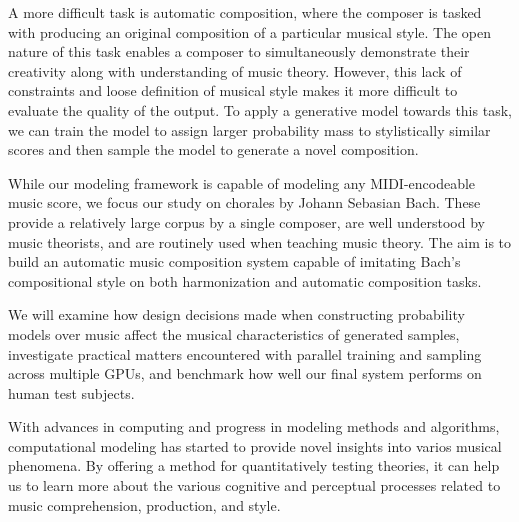 A more difficult task is automatic composition, where the composer is tasked
with producing an original composition of a particular musical style. The open
nature of this task enables a composer to simultaneously demonstrate their
creativity along with understanding of music theory. However, this lack of
constraints and loose definition of musical style makes it more difficult to
evaluate the quality of the output. To apply a generative model towards this
task, we can train the model to assign larger probability mass to stylistically
similar scores and then sample the model to generate a novel composition.

While our modeling framework is capable of modeling any MIDI-encodeable music
score, we focus our study on chorales by Johann Sebasian Bach. These provide
a relatively large corpus by a single composer, are well understood by music
theorists, and are routinely used when teaching music theory.
The aim is to build an automatic music composition system capable of imitating
Bach's compositional style on both harmonization and automatic composition tasks.

We will examine how design decisions made when constructing probability models
over music affect the musical characteristics of generated samples, investigate
practical matters encountered with parallel training and sampling across
multiple GPUs, and benchmark how well our final system performs on human test
subjects.

With advances in computing and progress in modeling methods and algorithms,
computational modeling has started to provide novel insights into varios
musical phenomena. By offering a method for quantitatively testing theories,
it can help us to learn more about the various cognitive and perceptual processes
related to music comprehension, production, and style.
